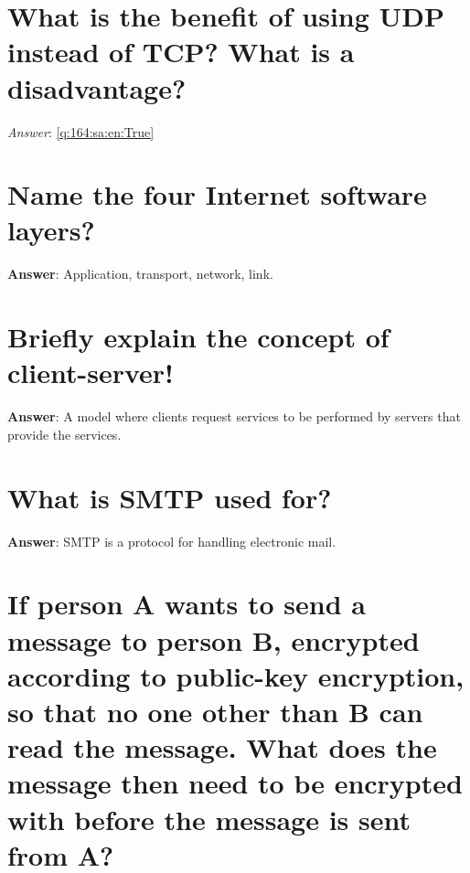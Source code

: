 \documentclass[a4paper,11pt,oneside]{book}
\begin{document}
\begin{sloppypar}
\section{What is the benefit of using UDP instead of TCP? What is a disadvantage?}

\label{q:164:sa:en:True}

\vspace{2cm}

\noindent\makebox[\textwidth]{\hrulefill}

\vspace{1cm}

\textit{Answer}: \autoref{q:164:sa:en:True}



\section{Name the four Internet software layers?}

\label{q:165:sa:en:True}

\textbf{Answer}: Application, transport, network, link.



\section{Briefly explain the concept of client-server!}

\label{q:166:sa:en:True}

\textbf{Answer}: A model where clients request services to be performed by servers that provide the services.



\section{What is SMTP used for?}

\label{q:167:sa:en:True}

\textbf{Answer}: SMTP is a protocol for handling electronic mail.



\section{If person A wants to send a message to person B, encrypted according to public-key encryption, so that no one other than B can read the message. What does the message then need to be encrypted with before the message is sent from A?}


\end{sloppypar}
\end{document}

